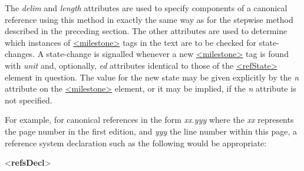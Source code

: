 The {\itshape delim} and {\itshape length} attributes are used to specify components of a canonical reference using this method in exactly the same way as for the stepwise method described in the preceding section. The other attributes are used to determine which instances of \hyperref[TEI.milestone]{<milestone>} tags in the text are to be checked for state-changes. A state-change is signalled whenever a new \hyperref[TEI.milestone]{<milestone>} tag is found with {\itshape unit} and, optionally, {\itshape ed} attributes identical to those of the \hyperref[TEI.refState]{<refState>} element in question. The value for the new state may be given explicitly by the {\itshape n} attribute on the \hyperref[TEI.milestone]{<milestone>} element, or it may be implied, if the {\itshape n} attribute is not specified.\par
For example, for canonical references in the form \textit{xx.yyy} where the \textit{xx} represents the page number in the first edition, and \textit{yyy} the line number within this page, a reference system declaration such as the following would be appropriate: \par\bgroup{}\exampleFont \begin{shaded}\noindent\mbox{}{<\textbf{refsDecl}>}\mbox{}\newline 
{}\mbox{}\newline 
{}\mbox{}\newline 

\end{shaded}
